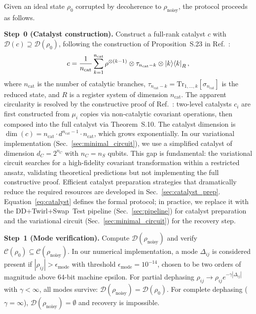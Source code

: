 \documentclass[prx,twocolumn,superscriptaddress,longbibliography,floatfix]{revtex4-2}
\begin{document}
Given an ideal state $\rho_0$ corrupted by decoherence to $\rho_\mathrm{noisy}$, the protocol proceeds as follows.

\textbf{Step~0 (Catalyst construction).}
Construct a full-rank catalyst $c$ with $\mathcal{D}(c) \supseteq \mathcal{D}(\rho_0)$, following the construction of Proposition~S.23 in Ref.~\cite{Shiraishi2024}:
\begin{equation}
c = \frac{1}{n_\mathrm{cat}} \sum_{k=1}^{n_\mathrm{cat}} \rho^{\otimes(k-1)} \otimes \tau_{n_\mathrm{cat}-k} \otimes \ket{k}\!\bra{k}_R,
\label{eq:catalyst}
\end{equation}
where $n_\mathrm{cat}$ is the number of catalytic branches, $\tau_{n_\mathrm{cat}-k} = \mathrm{Tr}_{1,\ldots,k}[\sigma_{n_\mathrm{cat}}]$ is the reduced state, and $R$ is a register system of dimension $n_\mathrm{cat}$.
The apparent circularity is resolved by the constructive proof of Ref.~\cite{Shiraishi2024}: two-level catalysts $c_i$ are first constructed from $\mu_i$ copies via non-catalytic covariant operations, then composed into the full catalyst via Theorem~S.10.
The catalyst dimension is $\dim(c) = n_\mathrm{cat} \cdot d^{n_\mathrm{cat}-1} \cdot n_\mathrm{cat}$, which grows exponentially.
In our variational implementation (Sec.~\ref{sec:minimal_circuit}), we use a simplified catalyst of dimension $d_C = 2^{n_C}$ with $n_C = n_S$ qubits.
This gap is fundamental: the variational circuit searches for a high-fidelity covariant transformation within a restricted ansatz, validating theoretical predictions but not implementing the full constructive proof.
Efficient catalyst preparation strategies that dramatically reduce the required resources are developed in Sec.~\ref{sec:catalyst_prep}.
Equation~\eqref{eq:catalyst} defines the formal protocol; in practice, we replace it with the DD+Twirl+Swap~Test pipeline (Sec.~\ref{sec:pipeline}) for catalyst preparation and the variational circuit (Sec.~\ref{sec:minimal_circuit}) for the recovery step.

\textbf{Step~1 (Mode verification).}
Compute $\mathcal{D}(\rho_\mathrm{noisy})$ and verify $\mathcal{C}(\rho_0) \subseteq \mathcal{C}(\rho_\mathrm{noisy})$.
In our numerical implementation, a mode $\Delta_{ij}$ is considered present if $|\rho_{ij}| > \epsilon_\mathrm{mode}$ with threshold $\epsilon_\mathrm{mode} = 10^{-14}$, chosen to be two orders of magnitude above 64-bit machine epsilon.
For partial dephasing $\rho_{ij} \to \rho_{ij} e^{-\gamma|\Delta_{ij}|}$ with $\gamma < \infty$, all modes survive: $\mathcal{D}(\rho_\mathrm{noisy}) = \mathcal{D}(\rho_0)$.
For complete dephasing ($\gamma = \infty$), $\mathcal{D}(\rho_\mathrm{noisy}) = \emptyset$ and recovery is impossible.
\end{document}
